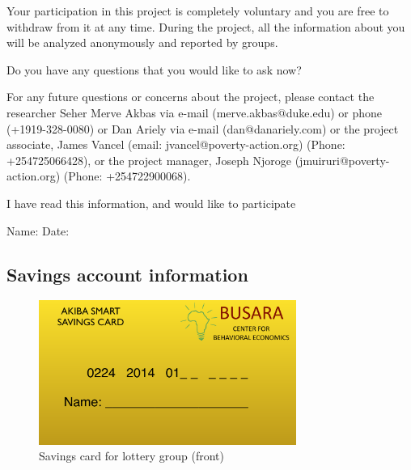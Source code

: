 \documentclass[11pt]{article}
\begin{document}
        \vspace{5mm}

        \noindent Your participation in this project is completely voluntary and you are free to withdraw from it at any time.  During the project, all the information about you will be analyzed anonymously and reported by groups.

        \vspace{5mm}

        \noindent Do you have any questions that you would like to ask now?

        \vspace{5mm}

        \noindent For any future questions or concerns about the project, please contact the researcher Seher Merve Akbas via e-mail (merve.akbas@duke.edu) or phone (+1919-328-0080) or Dan Ariely via e-mail (dan@danariely.com) or the project associate, James Vancel (email: jvancel@poverty-action.org) (Phone: +254725066428), or the project manager, Joseph Njoroge (jmuiruri@poverty-action.org) (Phone: +254722900068).

        \vspace{5mm}

        \noindent I have read this information, and would like to participate

        \vspace{5mm}

        \noindent Name: \qquad Date:

    \subsection{Savings account information}

        \begin{figure}[ht]
        \centering
        \caption{Savings card for lottery group (front)}
        \includegraphics[width=0.75\textwidth]{../../figures/id_front.pdf}
        \end{figure}
\end{document}
